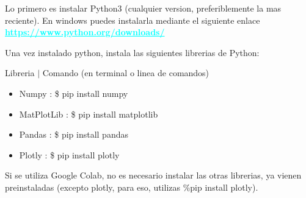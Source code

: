 \documentclass[12pt, Tahoma]{article}
\begin{document}
	
	Lo primero es instalar Python3 (cualquier version, preferiblemente la mas reciente). En windows puedes instalarla mediante el siguiente enlace\\ \textbf{\textcolor{cyan}{\underline{https://www.python.org/downloads/}}}
	
	
	Una vez instalado python, instala las siguientes librerias de Python:
	
	
	Libreria $|$ Comando (en terminal o linea de comandos)
	\begin{itemize}
		\item Numpy : \$ pip install numpy
		\item MatPlotLib : \$ pip install matplotlib
		\item Pandas : \$ pip install pandas
		\item Plotly : \$ pip install plotly
	\end{itemize}
	
	
	Si se utiliza Google Colab, no es necesario instalar las otras librerias, ya vienen preinstaladas (excepto plotly, para eso, utilizas \%pip install plotly).
	
\end{document}
